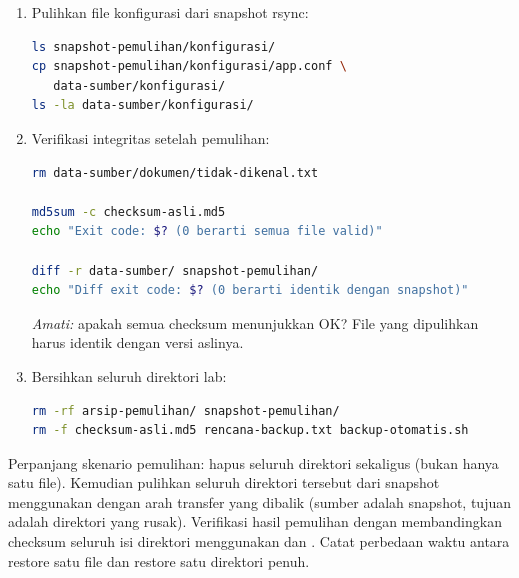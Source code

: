 \begin{enumerate}
\begin{lstlisting}[language=bash, caption={Restore dari arsip tar ke direktori sementara}]
mkdir -p /tmp/restore-lap14
tar -xzf arsip-pemulihan/full-backup.tar.gz \
    -C /tmp/restore-lap14 \
    data-sumber/dokumen/laporan.txt

ls /tmp/restore-lap14/data-sumber/dokumen/
cp /tmp/restore-lap14/data-sumber/dokumen/laporan.txt \
   data-sumber/dokumen/

rm -rf /tmp/restore-lap14
\end{lstlisting}

    \item Pulihkan file konfigurasi dari snapshot rsync:
\begin{lstlisting}[language=bash, caption={Restore dari snapshot rsync}]
ls snapshot-pemulihan/konfigurasi/
cp snapshot-pemulihan/konfigurasi/app.conf \
   data-sumber/konfigurasi/
ls -la data-sumber/konfigurasi/
\end{lstlisting}

    \item Verifikasi integritas setelah pemulihan:
\begin{lstlisting}[language=bash, caption={Verifikasi checksum setelah pemulihan}]
rm data-sumber/dokumen/tidak-dikenal.txt

md5sum -c checksum-asli.md5
echo "Exit code: $? (0 berarti semua file valid)"

diff -r data-sumber/ snapshot-pemulihan/
echo "Diff exit code: $? (0 berarti identik dengan snapshot)"
\end{lstlisting}
    \textit{Amati:} apakah semua checksum menunjukkan OK? File yang dipulihkan
    harus identik dengan versi aslinya.

    \item Bersihkan seluruh direktori lab:
\begin{lstlisting}[language=bash, caption={Membersihkan direktori praktek}]
rm -rf arsip-pemulihan/ snapshot-pemulihan/
rm -f checksum-asli.md5 rencana-backup.txt backup-otomatis.sh
\end{lstlisting}
\end{enumerate}

\begin{challengebox}
Perpanjang skenario pemulihan: hapus seluruh direktori 
sekaligus (bukan hanya satu file). Kemudian pulihkan seluruh direktori tersebut
dari snapshot menggunakan  dengan arah transfer yang dibalik (sumber
adalah snapshot, tujuan adalah direktori yang rusak). Verifikasi hasil pemulihan
dengan membandingkan checksum seluruh isi direktori menggunakan \cmd{find} dan
\cmd{md5sum}. Catat perbedaan waktu antara restore satu file dan restore satu
direktori penuh.
\end{challengebox}

